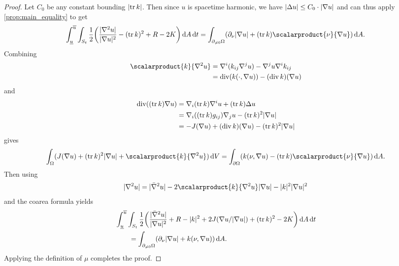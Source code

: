 \documentclass[draft]{amsart}
\newcommand*{\mathfullstop}{.}
\DeclarePairedDelimiter{\parens}{(}{)}
\let\p\parens %
\newcommand*{\laplacian}{\Delta}
\newcommand*{\boundary}{\partial}
\DeclareMathOperator{\divergence}{div}
\DeclareMathOperator{\trace}{tr}
\DeclarePairedDelimiter{\abs}{\lvert}{\rvert} %
\begin{document}
\begin{proof}
    Let \( C_0 \) be any constant bounding \( \abs{\trace{k}} \). Then since \( u   \) is spacetime harmonic, we have \( \abs{\laplacian u}\leq C_0\cdot \abs{\nabla u} \) and can thus apply \cref{prop:main_equality} to get
    \begin{equation*}
        \int_{\minu}^{\maxu}\int_{S_t} \frac{1}{2}\p*{\frac{\abs{\nabla^2 u}}{\abs{\nabla u}^2}-(\trace k)^2+R-2K }\odif{A}\odif{t}=      \int_{\nonzeroboundary }\p*{\partial_{\nu} \abs{\nabla u}+(\trace k)\scalarproduct{\nu}{\nabla u}}\odif{A}\mathfullstop
    \end{equation*}
    Combining
    \begin{align*}
        \scalarproduct{k}{\nabla^2 u}&=\nabla^i(k_{ij}\nabla^j u)-\nabla^j u \nabla^i k_{ij}\\
        &=\divergence(k(\cdot,\nabla u))-(\divergence{k})(\nabla u)
    \end{align*}
    and
    \begin{align*}
        \divergence((\trace k) \nabla u)&=\nabla_i(\trace{k}) \nabla^i u+(\trace k)\laplacian u\\
        &=\nabla_i((\trace{k})g_{ij})\nabla_j u-(\trace k)^2\abs{\nabla u}\\
        &=-J(\nabla u)+(\divergence{k})(\nabla u)-(\trace k)^2\abs{\nabla u}
    \end{align*}
    gives
    \begin{equation*}
        \int_{\Omega}(J(\nabla u)+(\trace k)^2 \abs{\nabla u}+\scalarproduct{k}{\nabla^2 u})\odif{V}=\int_{\boundary \Omega}(k(\nu,\nabla u)-(\trace k) \scalarproduct{\nu}{\nabla u})\odif{A}\mathfullstop
    \end{equation*}
    Then using
    \begin{equation*}
        \abs{\nabla^2 u}=\abs{\spacetimehessian u}-2\scalarproduct{k}{\nabla^2 u} \abs{\nabla u}-\abs{k}^2\abs{\nabla u}^2
    \end{equation*}
    and the coarea formula yields
    \begin{align*}
        &\int_{\minu}^{\maxu}\int_{S_t} \frac{1}{2}\p*{\frac{\abs{\spacetimehessian u}}{\abs{\nabla u}^2}+R-\abs{k}^2+2 J(\nabla u/\abs{\nabla u})+(\trace k)^2-2K }\odif{A}\odif{t}\\
        &\qquad=\int_{\nonzeroboundary }\p*{\partial_{\nu} \abs{\nabla u}+k(\nu,\nabla u)}\odif{A}\mathfullstop
    \end{align*}
    Applying the definition of \( \mu \) completes the proof.
    
    
\end{proof}
\end{document}
